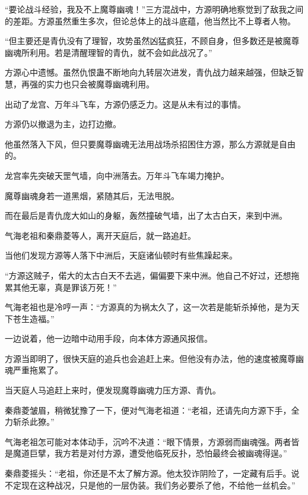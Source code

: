 
\begin{this_body}



“要论战斗经验，我及不上魔尊幽魂！”三方混战中，方源明确地察觉到了敌我之间的差距。方源虽然重生多次，但论总体上的战斗底蕴，他当然比不上尊者人物。

“但主要还是青仇没有了理智，攻势虽然凶猛疯狂，不顾自身，但多数还是被魔尊幽魂所利用。若是清醒理智的青仇，就不会如此战况了。”

方源心中遗憾。虽然仇恨蛊不断地向九转层次进发，青仇战力越来越强，但缺乏智慧，再强的实力也只会被魔尊幽魂利用。

出动了龙宫、万年斗飞车，方源仍感乏力。这是从未有过的事情。

方源仍以撤退为主，边打边撤。

他虽然落入下风，但只要魔尊幽魂无法用战场杀招困住方源，那么方源就是自由的。

龙宫率先突破天罡气墙，向中洲落去。万年斗飞车竭力掩护。

魔尊幽魂身若一道黑烟，紧随其后，无法甩脱。

而在最后是青仇庞大如山的身躯，轰然撞破气墙，出了太古白天，来到中洲。

气海老祖和秦鼎菱等人，离开天庭后，就一路追赶。

当他们发现方源等人落下中洲后，天庭诸仙顿时有些焦躁起来。

“方源这贼子，偌大的太古白天不去逃，偏偏要下来中洲。他自己不好过，还想拖累其他无辜，真是罪该万死！”

气海老祖也是冷哼一声：“方源真的为祸太久了，这一次若是能斩杀掉他，是为天下苍生造福。”

一边说着，他一边暗中动用手段，向本体方源通风报信。

方源当即明了，很快天庭的追兵也会追赶上来。但他没有办法，他的速度被魔尊幽魂严重拖累了。

当天庭人马追赶上来时，便发现魔尊幽魂力压方源、青仇。

秦鼎菱皱眉，稍微犹豫了一下，便对气海老祖道：“老祖，还请先向方源下手，全力斩杀此獠。”

气海老祖怎可能对本体动手，沉吟不决道：“眼下情景，方源弱而幽魂强。两者皆是魔道巨擘，我方若是对付方源，遭受他临死反扑，恐怕最终会被幽魂得逞。”

秦鼎菱摇头：“老祖，你还是不太了解方源。他太狡诈阴险了，一定藏有后手。说不定现在这种战况，只是他的一层伪装。我们务必要杀了他，不给他一丝机会。”


\end{this_body}

